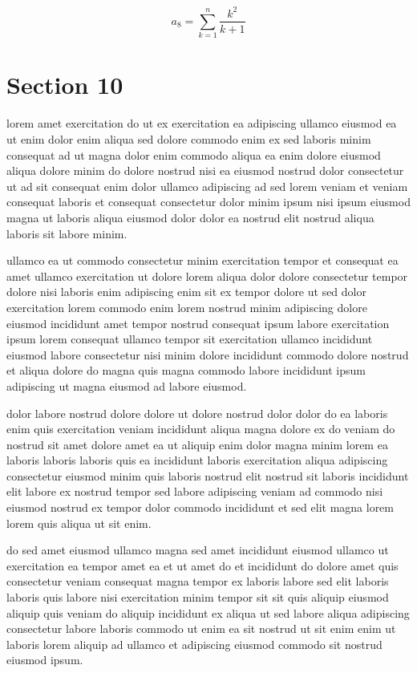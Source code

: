 \documentclass{article}
\begin{document}
\begin{equation} a_{8} = \sum_{k=1}^{n} \frac{k^2}{k+1} \end{equation}
\section{Section 10}
lorem amet exercitation do ut ex exercitation ea adipiscing ullamco eiusmod ea ut enim dolor enim aliqua sed dolore commodo enim ex sed laboris minim consequat ad ut magna dolor enim commodo aliqua ea enim dolore eiusmod aliqua dolore minim do dolore nostrud nisi ea eiusmod nostrud dolor consectetur ut ad sit consequat enim dolor ullamco adipiscing ad sed lorem veniam et veniam consequat laboris et consequat consectetur dolor minim ipsum nisi ipsum eiusmod magna ut laboris aliqua eiusmod dolor dolor ea nostrud elit nostrud aliqua laboris sit labore minim.

ullamco ea ut commodo consectetur minim exercitation tempor et consequat ea amet ullamco exercitation ut dolore lorem aliqua dolor dolore consectetur tempor dolore nisi laboris enim adipiscing enim sit ex tempor dolore ut sed dolor exercitation lorem commodo enim lorem nostrud minim adipiscing dolore eiusmod incididunt amet tempor nostrud consequat ipsum labore exercitation ipsum lorem consequat ullamco tempor sit exercitation ullamco incididunt eiusmod labore consectetur nisi minim dolore incididunt commodo dolore nostrud et aliqua dolore do magna quis magna commodo labore incididunt ipsum adipiscing ut magna eiusmod ad labore eiusmod.

dolor labore nostrud dolore dolore ut dolore nostrud dolor dolor do ea laboris enim quis exercitation veniam incididunt aliqua magna dolore ex do veniam do nostrud sit amet dolore amet ea ut aliquip enim dolor magna minim lorem ea laboris laboris laboris quis ea incididunt laboris exercitation aliqua adipiscing consectetur eiusmod minim quis laboris nostrud elit nostrud sit laboris incididunt elit labore ex nostrud tempor sed labore adipiscing veniam ad commodo nisi eiusmod nostrud ex tempor dolor commodo incididunt et sed elit magna lorem lorem quis aliqua ut sit enim.

do sed amet eiusmod ullamco magna sed amet incididunt eiusmod ullamco ut exercitation ea tempor amet ea et ut amet do et incididunt do dolore amet quis consectetur veniam consequat magna tempor ex laboris labore sed elit laboris laboris quis labore nisi exercitation minim tempor sit sit quis aliquip eiusmod aliquip quis veniam do aliquip incididunt ex aliqua ut sed labore aliqua adipiscing consectetur labore laboris commodo ut enim ea sit nostrud ut sit enim enim ut laboris lorem aliquip ad ullamco et adipiscing eiusmod commodo sit nostrud eiusmod ipsum.
\end{document}
